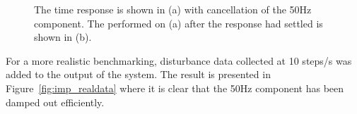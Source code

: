 \begin{figure}[h!]
  \centering %
  \qquad
  \caption{\label{fig:rfdc_p_atten} The time response is shown in (a) with cancellation of the 50Hz component. The \abbrFFT performed on (a) after the response had settled is shown in (b).}
\end{figure}

For a more realistic benchmarking, disturbance data collected at 10 steps/s was added to the output of the system. The result is presented in Figure~\ref{fig:imp_realdata} where it is clear that the 50Hz component has been damped out efficiently.

